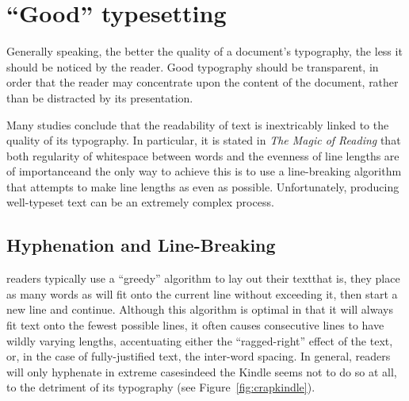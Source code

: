 \section{``Good'' typesetting}
\label{sec:goodtypesetting}

Generally speaking, the better the quality of a document's typography, the less it should be noticed by the reader. Good typography should be transparent, in order that the reader may concentrate upon the content of the document, rather than be distracted by its presentation.

Many studies\hspace{0pt}\cite{Mittelbach1992,Hill1999,Bringhurst2008,Voorhees2011,Legge2011} conclude that the readability of text is inextricably linked to the quality of its typography. In particular, it is stated in \emph{The Magic of Reading}\hspace{0pt}\cite{Hill1999} that both regularity of whitespace between words and the evenness of line lengths are of importance\ed and the only way to achieve this is to use a line-breaking algorithm that attempts to make line lengths as even as possible. Unfortunately, producing well-typeset text can be an extremely complex process\cite{Hurst2009}.


\subsection{Hyphenation and Line-Breaking}
\Ebook{} readers typically use a ``greedy'' algorithm to lay out their text\ed that is, they place as many words as will fit onto the current line without exceeding it, then start a new line and continue. Although this algorithm is optimal in that it will always fit text onto the fewest possible lines, it often causes consecutive lines to have wildly varying lengths, accentuating either the ``ragged-right'' effect of the text, or, in the case of fully-justified text, the inter-word spacing. In general, \ebook{} readers will only hyphenate in extreme cases\ed indeed the Kindle seems not to do so at all, to the detriment of its typography (see Figure~\ref{fig:crapkindle}).

